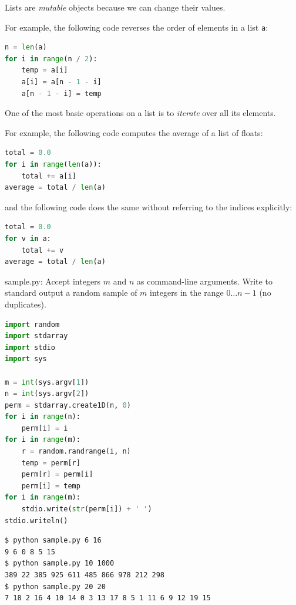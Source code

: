 \documentclass[8pt,a4paper,compress,handout]{beamer}
\begin{document}
\begin{frame}[fragile]
Lists are \emph{mutable} objects because we can change their values.

\bigskip

For example, the following code reverses the order of elements in a list \lstinline{a}:

\begin{lstlisting}[language=Python]
n = len(a)
for i in range(n / 2):
    temp = a[i]
    a[i] = a[n - 1 - i]
    a[n - 1 - i] = temp
\end{lstlisting}

\bigskip

One of the most basic operations on a list is to \emph{iterate} over all its elements.

\bigskip

For example, the following code computes the average of a list of floats:

\begin{lstlisting}[language=Python]
total = 0.0
for i in range(len(a)):
    total += a[i]
average = total / len(a)
\end{lstlisting}

and the following code does the same without referring to the indices explicitly:

\begin{lstlisting}[language=Python]
total = 0.0
for v in a:
    total += v
average = total / len(a)
\end{lstlisting}
\end{frame}

\begin{frame}[fragile]
\begin{framed}
\tiny sample.py: Accept integers $m$ and $n$ as command-line arguments. Write to standard output a random sample of $m$ integers in the range $0 \dots n-1$ (no duplicates).
\end{framed}

\begin{lstlisting}[language=Python]
import random
import stdarray
import stdio
import sys

m = int(sys.argv[1])
n = int(sys.argv[2])
perm = stdarray.create1D(n, 0)
for i in range(n):
    perm[i] = i
for i in range(m):
    r = random.randrange(i, n)
    temp = perm[r]
    perm[r] = perm[i]
    perm[i] = temp
for i in range(m):
    stdio.write(str(perm[i]) + ' ')
stdio.writeln()
\end{lstlisting}

\begin{lstlisting}[language={}]
$ python sample.py 6 16
9 6 0 8 5 15 
$ python sample.py 10 1000
389 22 385 925 611 485 866 978 212 298 
$ python sample.py 20 20
7 18 2 16 4 10 14 0 3 13 17 8 5 1 11 6 9 12 19 15 
\end{lstlisting}
\end{frame}
\end{document}

